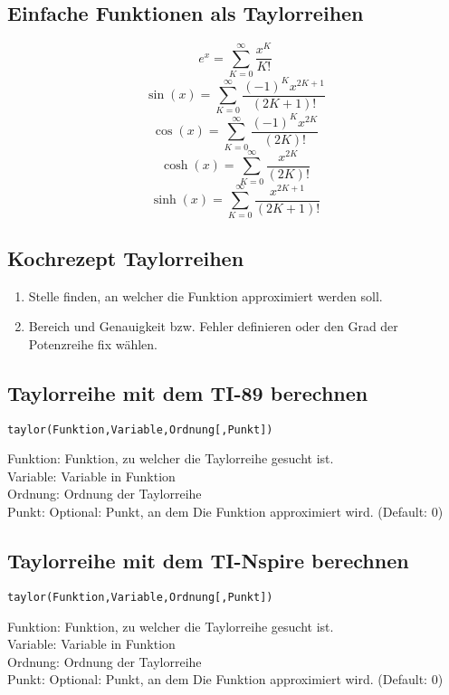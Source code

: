 \subsection{Einfache Funktionen als Taylorreihen}
\[ \boxed{e^x = \sum_{K=0}^{\infty} \frac{x^K}{K!}} \]
\[ \boxed{\sin(x) = \sum_{K=0}^{\infty} \frac{(-1)^K x^{2K+1}}{(2K+1)!}} \]
\[ \boxed{\cos(x) = \sum_{K=0}^{\infty} \frac{(-1)^K x^{2K}}{(2K)!}} \]
\[ \boxed{\cosh(x) = \sum_{K=0}^{\infty} \frac{x^{2K}}{(2K)!}} \]
\[ \boxed{\sinh(x) = \sum_{K=0}^{\infty} \frac{x^{2K+1}}{(2K+1)!}} \]

\subsection{Kochrezept Taylorreihen}
\begin{enumerate}
  \item Stelle finden, an welcher die Funktion approximiert werden soll. 
  \item Bereich und Genauigkeit bzw. Fehler definieren oder den Grad der Potenzreihe fix wählen. 
\end{enumerate}

\ifti
\subsection{Taylorreihe mit dem TI-89 berechnen}
\begin{verbatim}
taylor(Funktion,Variable,Ordnung[,Punkt])
\end{verbatim}
Funktion: Funktion, zu welcher die Taylorreihe gesucht ist. \\
Variable: Variable in Funktion\\
Ordnung: Ordnung der Taylorreihe\\
Punkt: Optional: Punkt, an dem Die Funktion approximiert wird. (Default: 0)
\fi
\ifnspire
\subsection{Taylorreihe mit dem TI-Nspire berechnen}
\begin{verbatim}
taylor(Funktion,Variable,Ordnung[,Punkt])
\end{verbatim}
Funktion: Funktion, zu welcher die Taylorreihe gesucht ist. \\
Variable: Variable in Funktion\\
Ordnung: Ordnung der Taylorreihe\\
Punkt: Optional: Punkt, an dem Die Funktion approximiert wird. (Default: 0)
\fi
